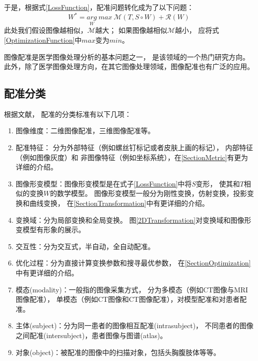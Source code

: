 于是，根据式\ref{LossFunction}，配准问题转化成为了以下问题：
\begin{equation}\label{OptimizationFunction}
  W^\ast=\underset{W}{arg} \ max \ \mathcal{M}(T,S\circ W)+\mathcal{R}(W)
\end{equation}
此处我们假设图像越相似，$\mathcal{M}$越大；
如果图像越相似$\mathcal{M}$越小，
应将式\ref{OptimizationFunction}中$max$变为$min$。

图像配准是医学图像处理分析的基本问题之一，
是该领域的一个热门研究方向。
此外，除了医学图像处理方向，在其它图像处理领域，图像配准也有广泛的应用。

\subsection{配准分类}\label{RegistrationClassification}
根据文献\cite{RegistrationSurvey,RegistrationSurveyNew}，
配准的分类标准有以下几项：
\begin{enumerate}
  \item 图像维度：二维图像配准，三维图像配准等。
  \item 配准特征：
    分为外部特征（例如螺丝钉标记或者皮肤上画的标记），
    内部特征（例如图像灰度）和
    非图像特征（例如坐标系统），在\ref{SectionMetric}有更为详细的介绍。
  \item 图像形变模型：图像形变模型是在式子\ref{LossFunction}中将$S$变形，
    使其和$T$相似的变换$W$的数学模型。
    图像形变模型一般分为刚性变换，仿射变换，投影变换和曲线变换，
    在\ref{SectionTransformation}中有更详细的介绍。
  \item 变换域：分为局部变换和全局变换。
    图\ref{2DTransformation}对变换域和图像形变模型有形象的展示。
  \item 交互性：分为交互式，半自动，全自动配准。
  \item 优化过程：分为直接计算变换参数和搜寻最优参数，
    在\ref{SectionOptimization}中有更详细的介绍。
  \item 模态(modality)：一般指的图像采集方式，
    分为多模态（例如CT图像与MRI图像配准），
    单模态（例如CT图像和CT图像配准），对模型配准和对患者配准。
  \item 主体(subject)：分为同一患者的图像相互配准(intrasubject)，
    不同患者的图像之间配准(intersubject)，患者图像与图谱(atlas)。
  \item 对象(object)：被配准的图像中的扫描对象，包括头胸腹肢体等等。
\end{enumerate}


